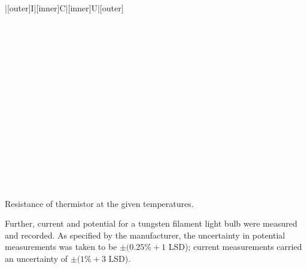 \begin{paper}
{\begin{papertable}{|[outer]I|[inner]C|[inner]U|[outer]}
			\papertableindex{}\\\paperiline
			\papertableindex{}\\\paperiline
			\papertableindex{}\\\paperiline
			\papertableindex{}\\\paperiline
			\papertableindex{}\\\paperiline
			\papertableindex{}\\\paperiline
			\papertableindex{}\\\paperiline
			\papertableindex{}\\\paperiline
			\papertableindex{}\\\paperiline
			\papertableindex{}\\\paperiline
			\papertableindex{}\\\paperiline
			\papertableindex{}\\\paperiline
			\papertableindex{}\\\paperiline
			\papertableindex{}\\\paperiline
			\papertableindex{}\\\paperiline
			\papertableindex{}\\\paperoline
		\end{papertable}\vspace{-1.5em}}
	{Resistance of thermistor at the given temperatures. }\vspace{0.5em}
	
	Further, current and potential for a tungsten filament light bulb were measured and recorded. As specified by the manufacturer, the uncertainty in potential measurements was taken to be \( \pm (0.25\% + 1 \) LSD); current measurements carried an uncertainty of \( \pm (1\% + 3 \) LSD). \vspace{0.5em}


\end{paper}
